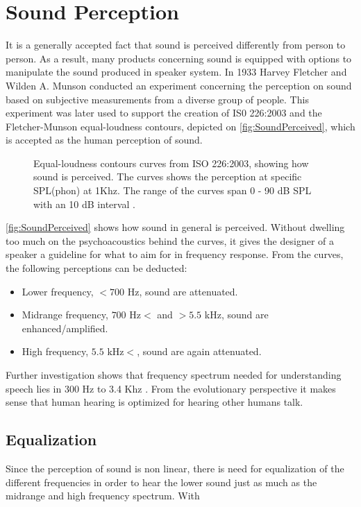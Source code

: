 \section{Sound Perception}

It is a generally accepted fact that sound is perceived differently from person to person. As a result, many products concerning sound is equipped with options to manipulate the sound produced in speaker system. In 1933 Harvey Fletcher and Wilden A. Munson conducted an experiment concerning the perception on sound based on subjective measurements from a diverse group of people. This experiment was later used to support the creation of IS0 226:2003 and the Fletcher-Munson equal-loudness contours, depicted on \autoref{fig:SoundPerceived}, which is accepted as the human perception of sound.

\begin{figure}[H]
\centering
{}

\caption{Equal-loudness contours curves from ISO 226:2003, showing how sound is perceived. The curves shows the perception at specific SPL(phon) at 1Khz. The range of the curves span 0 - 90 dB SPL with an 10 dB interval .}
\label{fig:SoundPerceived}
\end{figure}
\autoref{fig:SoundPerceived} shows how sound in general is perceived. Without dwelling too much on the psychoacoustics behind the curves, it gives the designer of a speaker a guideline for what to aim for in frequency response. From the curves, the following perceptions can be deducted:
\begin{itemize}
\item Lower frequency, $ < 700$ Hz, sound are attenuated.
\item Midrange frequency, $700 \text{ Hz} < $ and $ > 5.5$ kHz, sound are enhanced/amplified.
\item High frequency, $ 5.5 \text{ kHz} < $, sound are again attenuated.
\end{itemize}

Further investigation shows that frequency spectrum needed for understanding speech lies in 300 Hz to 3.4 Khz \citep{sou:VoiceFundamentals}. From the evolutionary perspective it makes sense that human hearing is optimized for hearing other humans talk. 

\subsection{Equalization}
Since the perception of sound is non linear, there is need for equalization of the different frequencies in order to hear the lower sound just as much as the midrange and high frequency spectrum. With   


